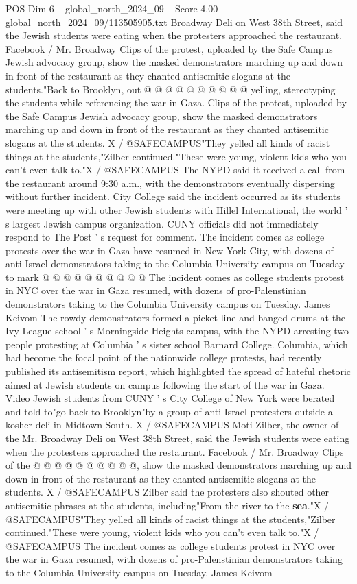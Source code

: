 \begin{textsample}{POS Dim 6 – global\_north\_2024\_09 – Score 4.00 – global\_north\_2024\_09/113505905.txt}
Broadway Deli on West 38th Street, said the Jewish students were eating when the protesters approached the restaurant.
Facebook / Mr.
Broadway Clips of the protest, uploaded by the Safe Campus Jewish advocacy group, show the masked demonstrators marching up and down in front of the restaurant as they chanted antisemitic slogans at the students."Back to Brooklyn, out @ @ @ @ @ @ @ @ @ @ yelling, stereotyping the students while referencing the war in Gaza.
Clips of the protest, uploaded by the Safe Campus Jewish advocacy group, show the masked demonstrators marching up and down in front of the restaurant as they chanted antisemitic slogans at the students.
X / @SAFECAMPUS"They yelled all kinds of racist things at the students,"Zilber continued."These were young, violent kids who you can't even talk to."X / @SAFECAMPUS The NYPD said it received a call from the restaurant around 9:30 a.m., with the demonstrators eventually dispersing without further incident.
City College said the incident occurred as its students were meeting up with other Jewish students with Hillel International, the world ' s largest Jewish campus organization.
CUNY officials did not immediately respond to The Post ' s request for comment.
The incident comes as college protests over the war in Gaza have resumed in New York City, with dozens of anti-Israel demonstrators taking to the Columbia University campus on Tuesday to mark @ @ @ @ @ @ @ @ @ @ The incident comes as college students protest in NYC over the war in Gaza resumed, with dozens of pro-Palenstinian demonstrators taking to the Columbia University campus on Tuesday.
James Keivom The rowdy demonstrators formed a picket line and banged drums at the Ivy League school ' s Morningside Heights campus, with the NYPD arresting two people protesting at Columbia ' s sister school Barnard College.
Columbia, which had become the focal point of the nationwide college protests, had recently published its antisemitism report, which highlighted the spread of hateful rhetoric aimed at Jewish students on campus following the start of the war in Gaza.
Video Jewish students from CUNY ' s City College of New York were berated and told to"go back to Brooklyn"by a group of anti-Israel protesters outside a kosher deli in Midtown South.
X / @SAFECAMPUS Moti Zilber, the owner of the Mr.
Broadway Deli on West 38th Street, said the Jewish students were eating when the protesters approached the restaurant.
Facebook / Mr.
Broadway Clips of the @ @ @ @ @ @ @ @ @ @, show the masked demonstrators marching up and down in front of the restaurant as they chanted antisemitic slogans at the students.
X / @SAFECAMPUS Zilber said the protesters also shouted other antisemitic phrases at the students, including"From the river to the \textbf{sea}."X / @SAFECAMPUS"They yelled all kinds of racist things at the students,"Zilber continued."These were young, violent kids who you can't even talk to."X / @SAFECAMPUS The incident comes as college students protest in NYC over the war in Gaza resumed, with dozens of pro-Palenstinian demonstrators taking to the Columbia University campus on Tuesday.
James Keivom

\end{textsample}
